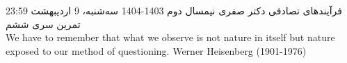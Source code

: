 \documentclass[11pt, a4, twoside]{article}
\begin{document}
	\pagestyle{empty}
	\heading
	{فرآیندهای تصادفی}
	{دکتر صفری}
	{نیمسال دوم 1403-1404}
    {سه‌شنبه، 9 اردیبهشت 23:59}
    {تمرین سری ششم}
	\inspiringQuotation
	{\\We have to remember that what we observe is not nature in itself but nature exposed to our method of questioning.}
	{Werner Heisenberg (1901-1976)}
	\begin{problem}
	
	\end{problem}
\end{document}
